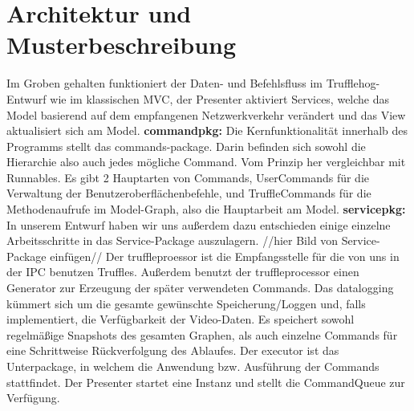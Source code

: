 \chapter{Architektur und Musterbeschreibung} 
Im Groben gehalten funktioniert der Daten- und Befehlsfluss im Trufflehog-Entwurf wie im klassischen MVC, der Presenter aktiviert Services, welche das Model basierend auf dem empfangenen Netzwerkverkehr verändert und das View aktualisiert sich am Model.\newline
\newline
\textbf{\gls{commandpkg}:} \newline
Die Kernfunktionalität innerhalb des Programms stellt das commands-package. Darin befinden sich sowohl die Hierarchie also auch jedes mögliche Command. Vom Prinzip her vergleichbar mit Runnables.\newline
Es gibt 2 Hauptarten von Commands, UserCommands für die Verwaltung der Benutzeroberflächenbefehle, und TruffleCommands für die Methodenaufrufe im Model-Graph, also die Hauptarbeit am Model.\newline
\newline
\textbf{\gls{servicepkg}:}\newline
In unserem Entwurf haben wir uns außerdem dazu entschieden einige einzelne Arbeitsschritte in das Service-Package auszulagern.\newline
 //hier Bild von Service-Package einfügen//\newline
Der truffleproessor ist die Empfangsstelle für die von uns in der IPC benutzen Truffles. Außerdem benutzt der truffleprocessor einen Generator zur Erzeugung der später verwendeten Commands.\newline
Das datalogging kümmert sich um die gesamte gewünschte Speicherung/Loggen und, falls implementiert, die Verfügbarkeit der Video-Daten. Es speichert sowohl regelmäßige Snapshots des gesamten Graphen, als auch einzelne Commands für eine Schrittweise Rückverfolgung des Ablaufes.\newline
Der executor ist das Unterpackage, in welchem die Anwendung bzw. Ausführung der Commands stattfindet. Der Presenter startet eine Instanz und stellt die CommandQueue zur Verfügung.
